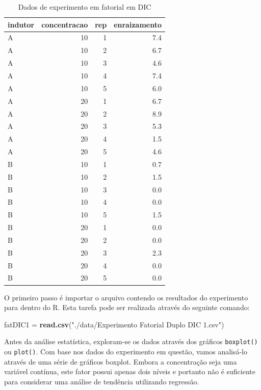 \documentclass[
]{article}
\newenvironment{Shaded}{\begin{snugshade}}{\end{snugshade}}
\newcommand{\KeywordTok}[1]{\textcolor[rgb]{0.13,0.29,0.53}{\textbf{#1}}}
\newcommand{\NormalTok}[1]{#1}
\newcommand{\StringTok}[1]{\textcolor[rgb]{0.31,0.60,0.02}{#1}}
\begin{document}
\begin{table}

\caption{\label{tab:unnamed-chunk-82}Dados de experimento em fatorial em DIC}
\centering
\begin{tabular}[t]{l|r|r|r}
\hline
indutor & concentracao & rep & enraizamento\\
\hline
A & 10 & 1 & 7.4\\
\hline
A & 10 & 2 & 6.7\\
\hline
A & 10 & 3 & 4.6\\
\hline
A & 10 & 4 & 7.4\\
\hline
A & 10 & 5 & 6.0\\
\hline
A & 20 & 1 & 6.7\\
\hline
A & 20 & 2 & 8.9\\
\hline
A & 20 & 3 & 5.3\\
\hline
A & 20 & 4 & 1.5\\
\hline
A & 20 & 5 & 4.6\\
\hline
B & 10 & 1 & 0.7\\
\hline
B & 10 & 2 & 1.5\\
\hline
B & 10 & 3 & 0.0\\
\hline
B & 10 & 4 & 0.0\\
\hline
B & 10 & 5 & 1.5\\
\hline
B & 20 & 1 & 0.0\\
\hline
B & 20 & 2 & 0.0\\
\hline
B & 20 & 3 & 2.3\\
\hline
B & 20 & 4 & 0.0\\
\hline
B & 20 & 5 & 0.0\\
\hline
\end{tabular}
\end{table}

O primeiro passo é importar o arquivo contendo os resultados do experimento para dentro do R. Esta tarefa pode ser realizada através do seguinte comando:

\begin{Shaded}
\begin{Highlighting}[]
\NormalTok{fatDIC1 =}\StringTok{ }\KeywordTok{read.csv}\NormalTok{(}\StringTok{"./data/Experimento Fatorial Duplo DIC 1.csv"}\NormalTok{)}
\end{Highlighting}
\end{Shaded}

Antes da análise estatística, exploram-se os dados através dos gráficos \texttt{boxplot()} ou \texttt{plot()}. Com base nos dados do experimento em questão, vamos analisá-lo através de uma série de gráficos boxplot. Embora a concentração seja uma variável contínua, este fator possui apenas dois níveis e portanto não é suficiente para considerar uma análise de tendência utilizando regressão.
\end{document}

